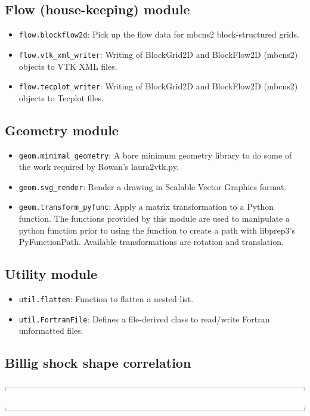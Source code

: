 \documentclass[12pt,a4paper,twoside]{article}
\newcommand{\topbar}{\ensuremath{
    \rule{0.1mm}{2.0mm} \rule[2.0mm]{159.5mm}{0.1mm} \rule{0.1mm}{2.0mm}
}}
\newcommand{\bottombar}{\ensuremath{
    \rule{0.1mm}{2.0mm} \rule{159.5mm}{0.1mm} \rule{0.1mm}{2.0mm}
}}
\begin{document}
\subsection{Flow (house-keeping) module}
  \begin{itemize}
   \item \verb!flow.blockflow2d!: Pick up the flow data for mbcns2 block-structured grids.
   \item \verb!flow.vtk_xml_writer!: Writing of BlockGrid2D and BlockFlow2D (mbcns2) objects to VTK XML files.
   \item \verb!flow.tecplot_writer!: Writing of BlockGrid2D and BlockFlow2D (mbcns2) objects to Tecplot files.
  \end{itemize}

\subsection{Geometry module}
  \begin{itemize}
   \item \verb!geom.minimal_geometry!: A bare minimum geometry library to do
         some of the work required by Rowan's laura2vtk.py.
   \item \verb!geom.svg_render!: Render a drawing in Scalable Vector Graphics format.
   \item \verb!geom.transform_pyfunc!: Apply a matrix transformation to a Python function.
         The functions provided by this module are used to manipulate a python function
         prior to using the function to create a path with libprep3's PyFunctionPath.
         Available transformations are rotation and translation.
  \end{itemize}

\subsection{Utility module}
  \begin{itemize}
   \item \verb!util.flatten!: Function to flatten a nested list.
   \item \verb!util.FortranFile!: Defines a file-derived class to read/write Fortran unformatted files.
  \end{itemize}

 
\subsection{Billig shock shape correlation}
\label{billig-correlation}
\topbar

\bottombar
\end{document}
